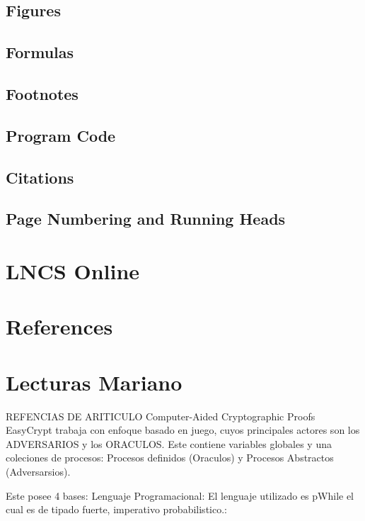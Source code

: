 \documentclass[runningheads,a4paper]{llncs}
\begin{document}
\subsection{Figures}





\subsection{Formulas}




\subsection{Footnotes}



\subsection{Program Code}


\subsection{Citations}


\subsection{Page Numbering and Running Heads}


\section{LNCS Online}




\section{References}


\section{Lecturas Mariano}
REFENCIAS DE ARITICULO 
Computer-Aided Cryptographic Proofs
EasyCrypt trabaja con enfoque basado en juego, cuyos principales actores son los ADVERSARIOS y los ORACULOS. Este contiene variables globales y una coleciones de procesos: Procesos definidos (Oraculos) y Procesos Abstractos (Adversarsios).

Este posee 4 bases:
Lenguaje Programacional:
El lenguaje utilizado es pWhile el cual es de tipado fuerte, imperativo probabilistico.:
\end{document}

